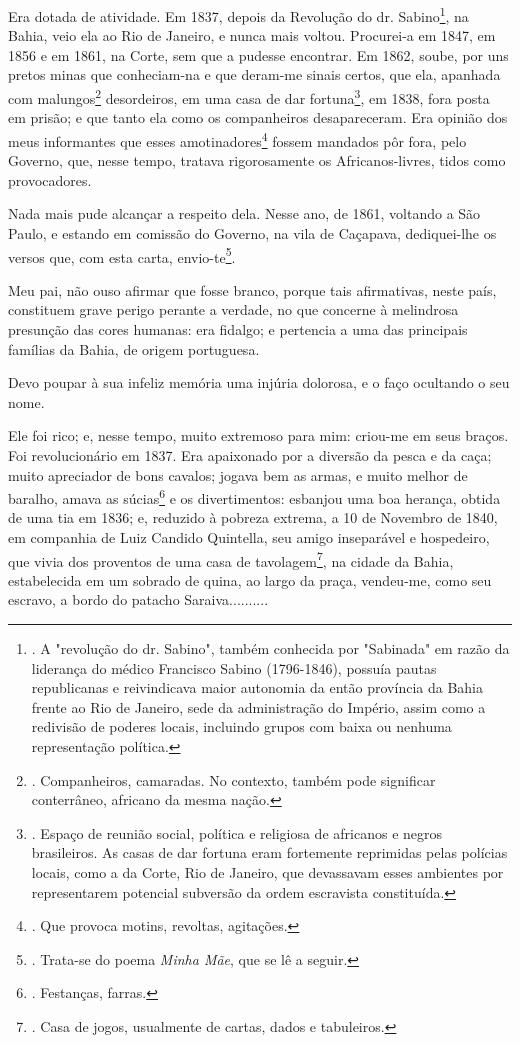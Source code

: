 Era dotada de atividade. Em 1837, depois da Revolução do dr.
Sabino\footnote{. A "revolução do dr. Sabino", também conhecida por
  "Sabinada" em razão da liderança do médico Francisco Sabino
  (1796-1846), possuía pautas republicanas e reivindicava maior
  autonomia da então província da Bahia frente ao Rio de Janeiro, sede
  da administração do Império, assim como a redivisão de poderes locais,
  incluindo grupos com baixa ou nenhuma representação política.}, na
Bahia, veio ela ao Rio de Janeiro, e nunca mais voltou. Procurei-a em
1847, em 1856 e em 1861, na Corte, sem que a pudesse encontrar. Em 1862,
soube, por uns pretos minas que conheciam-na e que deram-me sinais
certos, que ela, apanhada com malungos\footnote{. Companheiros,
  camaradas. No contexto, também pode significar conterrâneo, africano
  da mesma nação.} desordeiros, em uma {casa de dar fortuna}\footnote{.
  Espaço de reunião social, política e religiosa de africanos e negros
  brasileiros. As casas de dar fortuna eram fortemente reprimidas pelas
  polícias locais, como a da Corte, Rio de Janeiro, que devassavam esses
  ambientes por representarem potencial subversão da ordem escravista
  constituída.}, em 1838, fora posta em prisão; e que tanto ela como os
companheiros desapareceram. Era opinião dos meus informantes que esses
{amotinadores}\footnote{. Que provoca motins, revoltas, agitações.}
fossem mandados pôr fora, pelo Governo, que, nesse tempo, tratava
rigorosamente os Africanos-livres, tidos como provocadores.

Nada mais pude alcançar a respeito dela. Nesse ano, de 1861, voltando a
São Paulo, e estando em comissão do Governo, na vila de Caçapava,
dediquei-lhe os versos que, com esta carta, envio-te\footnote{. Trata-se
  do poema \emph{Minha Mãe}, que se lê a seguir.}.

Meu pai, não ouso afirmar que fosse branco, porque tais afirmativas,
neste país, constituem grave perigo perante a verdade, no que concerne à
melindrosa presunção das cores humanas: era fidalgo; e pertencia a uma
das principais famílias da Bahia, de origem portuguesa.

Devo poupar à sua infeliz memória uma injúria dolorosa, e o faço
ocultando o seu nome.

Ele foi rico; e, nesse tempo, muito extremoso para mim: criou-me em seus
braços. Foi revolucionário em 1837. Era apaixonado por a diversão da
pesca e da caça; muito apreciador de bons cavalos; jogava bem as armas,
e muito melhor de baralho, amava as súcias\footnote{. Festanças, farras.}
e os divertimentos: esbanjou uma boa herança, obtida de uma tia em 1836;
e, reduzido à pobreza extrema, a 10 de Novembro de 1840, em companhia de
Luiz Candido Quintella, seu amigo inseparável e hospedeiro, que vivia
dos proventos de uma casa de tavolagem\footnote{. Casa de jogos,
  usualmente de cartas, dados e tabuleiros.}, na cidade da Bahia,
estabelecida em um sobrado de quina, ao largo da praça, vendeu-me, como
seu escravo, a bordo do patacho {Saraiva}..........

